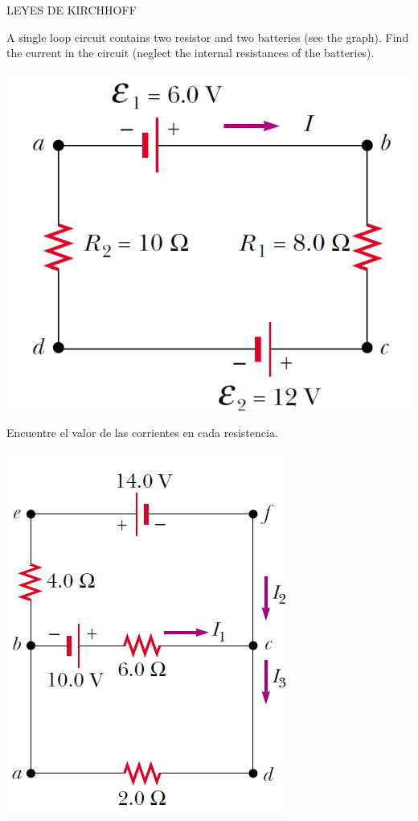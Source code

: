 \documentclass[12pt]{article}
\begin{document}
\begin{enumerate}
\vspace{1.0 cm}
LEYES DE KIRCHHOFF 

\begin{minipage}{11 cm}{
\item A single loop circuit contains two resistor and two batteries (see the graph). Find the current in the circuit (neglect the internal resistances of the batteries).}
\end{minipage}
\begin{minipage}{5 cm}{
\includegraphics[scale=0.25]{grafica4}
}
\end{minipage}

\begin{minipage}{11 cm}{
\item Encuentre el valor de las corrientes en cada resistencia.}
\end{minipage}
\begin{minipage}{5 cm}{
\includegraphics[scale=0.3]{grafica5}
}
\end{minipage} 



\end{enumerate}
\end{document}
